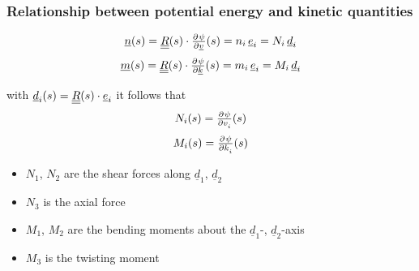 \begin{frame}
  \frametitle{Relationship between potential energy and kinetic quantities}
 
  \begin{displaymath}
    \underline{n}(s) = \doubleunderline{R}(s) \cdot \pd{\psi}{\underline{v}}(s) =
    n_i \, \underline{e}_i = N_i \, \underline{d}_i
  \end{displaymath}
  \begin{displaymath}
    \underline{m}(s) = \doubleunderline{R}(s) \cdot \pd{\psi}{\underline{k}}(s) =
    m_i \, \underline{e}_i = M_i \, \underline{d}_i
  \end{displaymath}
  
  with $\underline{d}_i(s) = \underline{\underline{R}}(s) \cdot \underline{e}_i$ it follows that
  \begin{displaymath}
    N_i(s) = \pd{\psi}{v_i}(s)
  \end{displaymath}
  \begin{displaymath}
    M_i(s) = \pd{\psi}{k_i}(s)
  \end{displaymath}
  
  \vspace{0.5em}
  \begin{itemize}
    \item $N_1$, $N_2$ are the shear forces along $\underline{d}_1$, $\underline{d}_2$
    \item $N_3$ is the axial force
    \item $M_1$, $M_2$ are the bending moments about the $\underline{d}_1$-, $\underline{d}_2$-axis
    \item $M_3$ is the twisting moment
  \end{itemize}
\end{frame}

